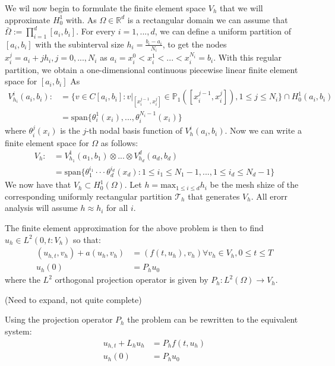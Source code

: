 We wil now begin to formulate the finite element space $V_h$ that we will approximate $H^1_0$ with.
As $\Omega \in \mathbb{R}^d$ is a rectangular domain we can assume that $\bar \Omega := \prod^d_{i=1}[a_i,b_i]$.
For every $i = 1,...,d$, we can define a uniform partition of $[a_i,b_i]$ with the subinterval size $h_i = \frac{b_i - a_i}{N_i}$,
to get the nodes $x^j_i = a_i + jh_i, j = 0,...,N_i$ as $a_i = x_i^0 < x_i^1 < ... < x_i^{N_i} = b_i$.
With this regular partition, we obtain a one-dimensional continuous piecewise linear finite element space for $[a_i,b_i]$ As
\begin{align*}
    V^i_{h_i}(a_i,b_i) :&= \{v\in C[a_i,b_i]: v|_{[x^{j-1}_i, x^j_i]}\in\mathbb{P}_1([x_i^{j-1},x_i^j]),1\leq j \leq N_i\} \cap H^1_0(a_i,b_i)\\
    &=\text{span}\{\theta^1_i(x_i), ... , \theta^{N_i-1}_i(x_i)\} 
\end{align*}
where $\theta^j_i(x_i)$ is the $j$-th nodal basis function of $V_h^i(a_i,b_i)$. 
Now we can write a finite element space for $\Omega$ as follows:
\begin{align*}
    V_h :&= V_{h_1}^1(a_1,b_1) \otimes ... \otimes V^d_{h_d}(a_d,b_d)\\
    &= \text{span}\{\theta_1^{i_1}\cdot \cdot \cdot \theta_d^{i_d}(x_d): 1 \leq i_1 \leq N_1-1,...,1\leq i_d \leq N_d-1\}
\end{align*}
We now have that $V_h\subset H^1_0(\Omega)$.
Let $h=\text{max}_{1\leq i\leq d}h_i$ be the mesh shize of the corresponding uniformly rectangular partition $\mathcal{T}_h$ that generates $V_h$.
All erorr analysis will assume $h\approx h_i$ for all $i$.

The finite element approximation for the above problem is then to find $u_h \in L^2(0,t:V_h)$ so that:
\begin{align*}
    (u_{h,t},v_h) + a(u_h,v_h) &=(f(t,u_h),v_h) \forall v_h \in V_h, 0\leq t \leq T\\
    u_h(0) &= P_hu_0
\end{align*}
where the $L^2$ orthogonal projection operator is given by $P_h:L^2(\Omega) \rightarrow V_h$.

(Need to expand, not quite complete)

Using the projection operator $P_h$ the problem can be rewritten to the equivalent system:
\begin{align*}
    u_{h,t} + L_hu_h &= P_hf(t,u_h)\\
    u_h(0) &= P_hu_0
\end{align*}

